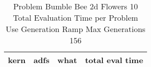 \begin{table}[H]
\caption{Problem  Bumble Bee 2d  Flowers 10\\Total Evaluation Time per Problem \\ Use Generation Ramp  Max Generations 156\\}
\begin{center}
\scalebox{1.0} %
{
\begin{tabular}{lllr}
\hline
kern & adfs & what & total eval time \\
\hline


\end{tabular}
}
\end{center}
\end{table}

